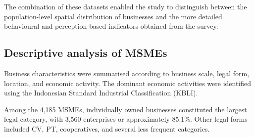 \documentclass[
  default,
]{sn-jnl}
\begin{document}
The combination of these datasets enabled the study to distinguish
between the population-level spatial distribution of businesses and the
more detailed behavioural and perception-based indicators obtained from
the survey.

\subsection{Descriptive analysis of
MSMEs}\label{descriptive-analysis-of-msmes}

Business characteristics were summarised according to business scale,
legal form, location, and economic activity. The dominant economic
activities were identified using the Indonesian Standard Industrial
Classification (KBLI).

Among the 4,185 MSMEs, individually owned businesses constituted the
largest legal category, with 3,560 enterprises or approximately 85.1\%.
Other legal forms included CV, PT, cooperatives, and several less
frequent categories.
\end{document}
